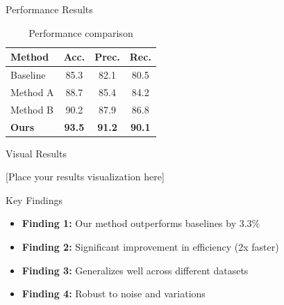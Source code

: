 \documentclass[aspectratio=169]{beamer}
\begin{document}
\begin{frame}{Performance Results}
    \begin{table}
        \centering
        \begin{tabular}{lccc}
            \toprule
            \textbf{Method} & \textbf{Acc.} & \textbf{Prec.} & \textbf{Rec.} \\
            \midrule
            Baseline & 85.3 & 82.1 & 80.5 \\
            Method A & 88.7 & 85.4 & 84.2 \\
            Method B & 90.2 & 87.9 & 86.8 \\
            \textbf{Ours} & \textbf{93.5} & \textbf{91.2} & \textbf{90.1} \\
            \bottomrule
        \end{tabular}
        \caption{Performance comparison}
    \end{table}
\end{frame}

\begin{frame}{Visual Results}
    \begin{center}
        
        \vspace{2cm}
        [Place your results visualization here]
        \vspace{2cm}
    \end{center}
\end{frame}

\begin{frame}{Key Findings}
    \begin{itemize}
        \item<1-> \textbf{Finding 1:} Our method outperforms baselines by 3.3\%
        \item<2-> \textbf{Finding 2:} Significant improvement in efficiency (2x faster)
        \item<3-> \textbf{Finding 3:} Generalizes well across different datasets
        \item<4-> \textbf{Finding 4:} Robust to noise and variations
    \end{itemize}
    
\end{frame}
\end{document}
